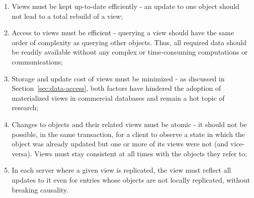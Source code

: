 \begin{enumerate}
	\item Views must be kept up-to-date efficiently - an update to one object should not lead to a total rebuild of a view; 
	\item Access to views must be efficient - querying a view should have the same order of complexity as querying other objects.
	Thus, all required data should be readily available without any complex or time-consuming computations or communications;
	\item Storage and update cost of views must be minimized - as discussed in Section~\ref{sec:data-access}, both factors have hindered the adoption of materialized views in commercial databases and remain a hot topic of research;
	\item \label{item:objviewconsistency} Changes to objects and their related views must be atomic - it should not be possible, in the same transaction, for a client to observe a state in which the object was already updated but one or more of its views were not (and vice-versa). Views must stay consistent at all times with the objects they refer to;
	\item In each server where a given view is replicated, the view must reflect all updates to it even for entries whose objects are not locally replicated, without breaking causality.
\end{enumerate}


